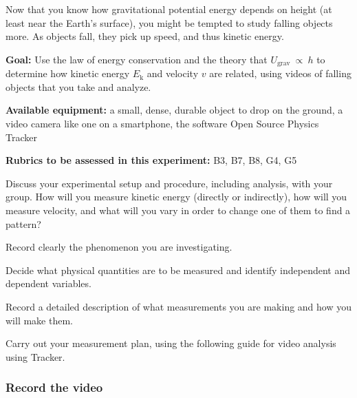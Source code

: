 Now that you know how gravitational potential energy depends on height (at least near the Earth's surface), you might be tempted to study falling objects more. As objects fall, they pick up speed, and thus kinetic energy.

\textbf{Goal:} Use the law of energy conservation and the theory that $U_\mathrm{grav}\: \propto\: h$ to determine how kinetic energy $E_\mathrm{k}$ and velocity $v$ are related, using videos of falling objects that you take and analyze.

\textbf{Available equipment:} a small, dense, durable object to drop on the ground, a video camera like one on a smartphone, the software Open Source Physics Tracker

\textbf{Rubrics to be assessed in this experiment:} B3, B7, B8, G4, G5

\begin{steps}
	\item Discuss your experimental setup and procedure, including analysis, with your group. How will you measure kinetic energy (directly or indirectly), how will you measure velocity, and what will you vary in order to change one of them to find a pattern?
	
	\item Record clearly the phenomenon you are investigating.
	
	\item Decide what physical quantities are to be measured and identify independent and dependent variables.
	
	\item Record a detailed description of what measurements you are making and how you will make them.
	
	\item Carry out your measurement plan, using the following guide for video analysis using Tracker.
\end{steps}

\subsubsection{Record the video}

